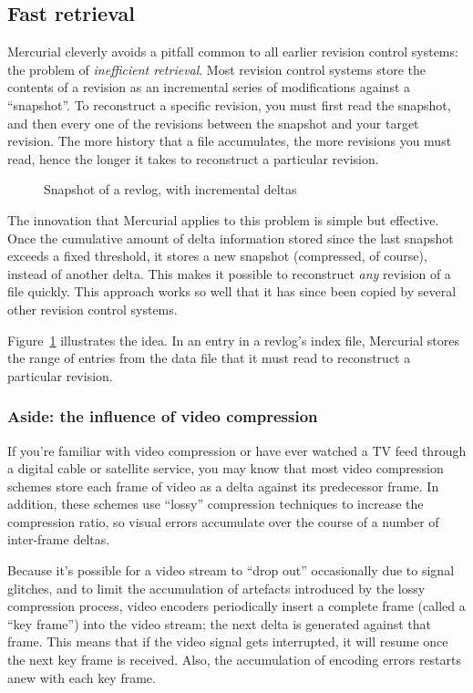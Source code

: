 \subsection{Fast retrieval}

Mercurial cleverly avoids a pitfall common to all earlier
revision control systems: the problem of \emph{inefficient retrieval}.
Most revision control systems store the contents of a revision as an
incremental series of modifications against a ``snapshot''.  To
reconstruct a specific revision, you must first read the snapshot, and
then every one of the revisions between the snapshot and your target
revision.  The more history that a file accumulates, the more
revisions you must read, hence the longer it takes to reconstruct a
particular revision.

\begin{figure}[ht]
  \centering
  \caption{Snapshot of a revlog, with incremental deltas}
  \label{fig:concepts:snapshot}
\end{figure}

The innovation that Mercurial applies to this problem is simple but
effective.  Once the cumulative amount of delta information stored
since the last snapshot exceeds a fixed threshold, it stores a new
snapshot (compressed, of course), instead of another delta.  This
makes it possible to reconstruct \emph{any} revision of a file
quickly.  This approach works so well that it has since been copied by
several other revision control systems.

Figure~\ref{fig:concepts:snapshot} illustrates the idea.  In an entry
in a revlog's index file, Mercurial stores the range of entries from
the data file that it must read to reconstruct a particular revision.

\subsubsection{Aside: the influence of video compression}

If you're familiar with video compression or have ever watched a TV
feed through a digital cable or satellite service, you may know that
most video compression schemes store each frame of video as a delta
against its predecessor frame.  In addition, these schemes use
``lossy'' compression techniques to increase the compression ratio, so
visual errors accumulate over the course of a number of inter-frame
deltas.

Because it's possible for a video stream to ``drop out'' occasionally
due to signal glitches, and to limit the accumulation of artefacts
introduced by the lossy compression process, video encoders
periodically insert a complete frame (called a ``key frame'') into the
video stream; the next delta is generated against that frame.  This
means that if the video signal gets interrupted, it will resume once
the next key frame is received.  Also, the accumulation of encoding
errors restarts anew with each key frame.

